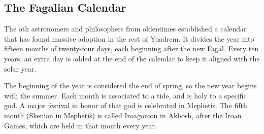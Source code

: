 \subsection*{The Fagalian Calendar} \label{ssec::thefagaliancalendar}
The oth astronomers and philosophers from oldentimes established a calendar that has found massive adoption in the rest of Yuadrem.
It divides the year into fifteen months of twenty-four days, each beginning after the new Fagal.
Every ten years, an extra day is added at the end of the calendar to keep it aligned with the solar year.

The beginning of the year is considered the end of spring, so the new year begins with the summer.
Each month is associated to a tide, and is holy to a specific god.
A major festival in honor of that god is celebrated in Mephetis.
The fifth month (Skenion in Mephetis) is called Iroagonion in Akhosh, after the Iroan Games, which are held in that month every year.

